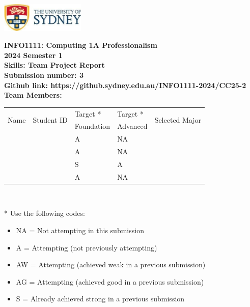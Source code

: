 \documentclass[a4paper, 11pt]{report}
\begin{document}
\begin{titlepage}
\begin{flushright}
\includegraphics[width=4cm]{USyd}\\[1cm]
\end{flushright}

\begin{centering}
\textbf{\huge INFO1111: Computing 1A Professionalism}\\[0.75cm]
\textbf{\huge 2024 Semester 1}\\[2cm]
\textbf{\huge Skills: Team Project Report}\\[2cm]

\textbf{\large Submission number: 3}\\[0.5cm]
\textbf{\large Github link: https://github.sydney.edu.au/INFO1111-2024/CC25-2}\\[0.75cm]
\textbf{\huge Team Members:}\\[0.75cm]

\begin{tabular}{|p{}|p{}|p{}|p{}|p{}|}
	\hline
	\multirow{2}{*}{Name} & \multirow{2}{*}{Student ID} & Target * & Target * & \multirow{2}{*}{Selected Major} \\
	 & & Foundation & Advanced & \\
	\hline
	\hline
	\raggedright{\studA} & \sidA & A & NA & \majA \\
	\hline
	\raggedright{\studB} & \sidB & A & NA & \majB \\
	\hline
	\raggedright{\studC} & \sidC & S & A & \majC \\
	\hline
	\raggedright{\studD} & \sidD & A & NA & \majD \\
	\hline
\end{tabular}
\\[0.5cm]
\end{centering}

* Use the following codes:
\begin{itemize}
\setlength\itemsep{0em}
\item NA = Not attempting in this submission
\item A = Attempting (not previously attempting)
\item AW = Attempting (achieved weak in a previous submission) 
\item AG = Attempting (achieved good in a previous submission)
\item S = Already achieved strong in a previous submission
\end{itemize}

\thispagestyle{empty}
\end{titlepage}
\end{document}
